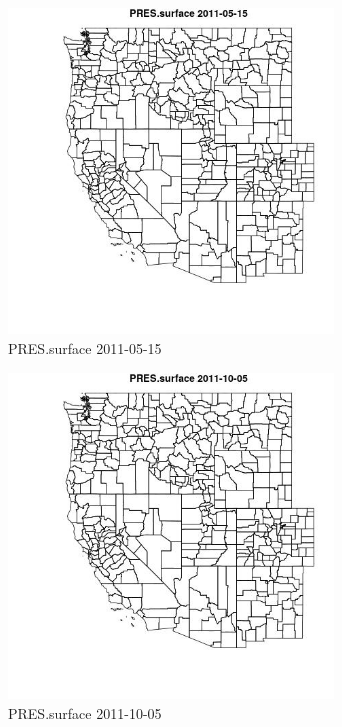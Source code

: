 \begin{figure} 
\centering  
\includegraphics[width=0.77\textwidth]{Code_Outputs/ML_input_report_ML_input_PM25_Step5_part_d_de_duplicated_aves_ML_input_MapObsPRESsurface2011-05-15.jpg} 
\caption{\label{fig:ML_input_report_ML_input_PM25_Step5_part_d_de_duplicated_aves_ML_inputMapObsPRESsurface2011-05-15}PRES.surface 2011-05-15} 
\end{figure} 
 

\begin{figure} 
\centering  
\includegraphics[width=0.77\textwidth]{Code_Outputs/ML_input_report_ML_input_PM25_Step5_part_d_de_duplicated_aves_ML_input_MapObsPRESsurface2011-10-05.jpg} 
\caption{\label{fig:ML_input_report_ML_input_PM25_Step5_part_d_de_duplicated_aves_ML_inputMapObsPRESsurface2011-10-05}PRES.surface 2011-10-05} 
\end{figure} 
 

